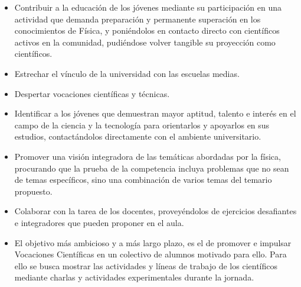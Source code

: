\documentclass[a0paper,portrait,final,fontscale=0.302]{baposter}
\begin{document}
\begin{poster}
{  \begin{itemize}[wide, labelwidth=!, labelindent=0pt]\setlength\itemsep{0em}
  \item Contribuir a la educación de los jóvenes mediante su
    participación en una actividad que demanda preparación y
    permanente superación en los conocimientos de Física, y
    poniéndolos en contacto directo con científicos activos en la
    comunidad, pudiéndose volver tangible su proyección como
    científicos.
  \item Estrechar el vínculo de la universidad con las escuelas
    medias.
  \item Despertar vocaciones científicas y técnicas.
  \item Identificar a los jóvenes que demuestran mayor aptitud,
    talento e interés en el campo de la ciencia y la tecnología para
    orientarlos y apoyarlos en sus estudios, contactándolos
    directamente con el ambiente universitario.
  \item Promover una visión integradora de las temáticas abordadas por
    la física, procurando que la prueba de la competencia incluya
    problemas que no sean de temas específicos, sino una combinación
    de varios temas del temario propuesto.
  \item Colaborar con la tarea de los docentes, proveyéndolos de
    ejercicios desafiantes e integradores que pueden proponer en el
    aula.
  \item El objetivo más ambicioso y a más largo plazo, es el de
    promover e impulsar Vocaciones Científicas en un colectivo de
    alumnos motivado para ello. Para ello se busca mostrar las
    actividades y líneas de trabajo de los científicos mediante
    charlas y actividades experimentales durante la jornada.
  \end{itemize}
}












\end{poster}
\end{document}
